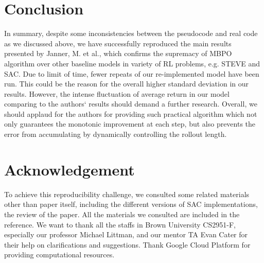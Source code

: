 \section{Conclusion}
In summary, despite some inconsistencies between the pseudocode and real code as we discussed above, we have successfully reproduced the main results presented by Janner, M. et al., which confirms the supremacy of MBPO algorithm over other baseline models in variety of RL problems, e.g. STEVE and SAC. Due to limit of time, fewer repeats of our re-implemented model have been run. This could be the reason for the overall higher standard deviation in our results. However, the intense fluctuation of average return in our model comparing to the authors` results should demand a further research. Overall, we should applaud for the authors for providing such practical algorithm which not only guarantees the monotonic improvement at each step, but also prevents the error from accumulating by dynamically controlling the rollout length.

\section*{Acknowledgement}
To achieve this reproducibility challenge, we consulted some related materials other than paper itself, including the different versions of SAC implementations, the review of the paper. All the materials we consulted are included in the reference.
We want to thank all the staffs in Brown University CS2951-F, especially our professor Michael Littman, and our mentor TA Evan Cater for their help on clarifications and suggestions. Thank Google Cloud Platform for providing computational resources.

